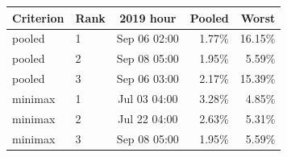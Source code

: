 \begin{tabular}{llcrr}
\toprule
Criterion & Rank & 2019 hour & Pooled & Worst \\
\midrule
pooled & 1 & Sep 06 02:00 & 1.77\% & 16.15\% \\
pooled & 2 & Sep 08 05:00 & 1.95\% & 5.59\% \\
pooled & 3 & Sep 06 03:00 & 2.17\% & 15.39\% \\
minimax & 1 & Jul 03 04:00 & 3.28\% & 4.85\% \\
minimax & 2 & Jul 22 04:00 & 2.63\% & 5.31\% \\
minimax & 3 & Sep 08 05:00 & 1.95\% & 5.59\% \\
\bottomrule
\end{tabular}
